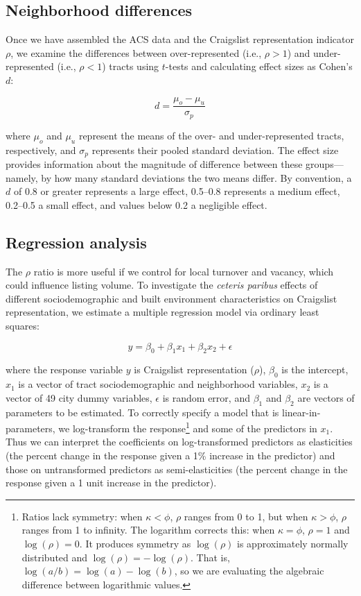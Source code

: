 \documentclass[12pt,onecolumn]{article} %
\begin{document}
\subsection{Neighborhood differences}

Once we have assembled the ACS data and the Craigslist representation indicator $\rho$, we examine the differences between over-represented (i.e., $\rho>1$) and under-represented (i.e., $\rho<1$) tracts using $t$-tests and calculating effect sizes as Cohen's $d$:

\begin{equation}
	\label{eq:cohen_d}
	d = \frac{\mu_o - \mu_u}{\sigma_p}
\end{equation}

where $\mu_o$ and $\mu_u$ represent the means of the over- and under-represented tracts, respectively, and $\sigma_p$ represents their pooled standard deviation. The effect size provides information about the magnitude of difference between these groups---namely, by how many standard deviations the two means differ. By convention, a $d$ of 0.8 or greater represents a large effect, 0.5--0.8 represents a medium effect, 0.2--0.5 a small effect, and values below 0.2 a negligible effect.

\subsection{Regression analysis}

The $\rho$ ratio is more useful if we control for local turnover and vacancy, which could influence listing volume. To investigate the \textit{ceteris paribus} effects of different sociodemographic and built environment characteristics on Craigslist representation, we estimate a multiple regression model via ordinary least squares:

\begin{equation}
	\label{eq:regression_formula}
	y = \beta_0 + \beta_1 x_1 + \beta_2 x_2 + \epsilon
\end{equation}

where the response variable $y$ is Craigslist representation ($\rho$), $\beta_0$ is the intercept, $x_1$ is a vector of tract sociodemographic and neighborhood variables, $x_2$ is a vector of 49 city dummy variables, $\epsilon$ is random error, and $\beta_1$ and $\beta_2$ are vectors of parameters to be estimated. To correctly specify a model that is linear-in-parameters, we log-transform the response\footnote{Ratios lack symmetry: when $\kappa < \phi$, $\rho$ ranges from 0 to 1, but when  $\kappa > \phi$, $\rho$ ranges from 1 to infinity. The logarithm corrects this: when $\kappa = \phi$, $\rho = 1$ and $\log(\rho) = 0$. It produces symmetry as $\log(\rho)$ is approximately normally distributed and $\log(\rho) = -\log(\rho)$. That is, $\log(a/b) = \log(a)-\log(b)$, so we are evaluating the algebraic difference between logarithmic values.} and some of the predictors in $x_1$. Thus we can interpret the coefficients on log-transformed predictors as elasticities (the percent change in the response given a 1\% increase in the predictor) and those on untransformed predictors as semi-elasticities (the percent change in the response given a 1 unit increase in the predictor).
\end{document}
